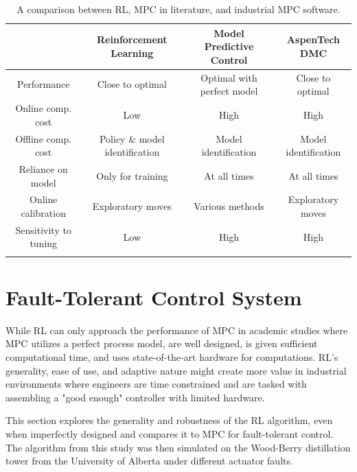 \begin{table}[H]
\caption{A comparison between RL, MPC in literature, and industrial MPC software.}
\centering
{\scriptsize
\begin{tabular}{c|c|c|c}
& \textbf{Reinforcement Learning}	& \textbf{Model Predictive Control} & \textbf{AspenTech DMC}\\
\hline
Performance             & Close to optimal			& Optimal with perfect model   &  Close to optimal \\
Online comp. cost		& Low			& High   &  High \\
Offline comp. cost		& Policy \& model identification			& Model identification   &  Model identification \\
Reliance on model         	& Only for training			& At all times   &  At all times \\
Online calibration		& Exploratory moves			&  Various methods   &  Exploratory moves \\
Sensitivity to tuning   & Low			& High   &  High \\
\label{tab:rl_mpc_dmc}
\end{tabular}}
\end{table}

%
%
% 
%  
% 
% 
% 

\section{Fault-Tolerant Control System}
While RL can only approach the performance of MPC in academic studies where MPC utilizes a perfect process model, are well designed, is given sufficient computational time, and uses state-of-the-art hardware for computations.  RL's generality, ease of use, and adaptive nature might create more value in industrial environments where engineers are time constrained and are tasked with assembling a "good enough" controller with limited hardware.

This section explores the generality and robustness of the RL algorithm, even when imperfectly designed and compares it to MPC for fault-tolerant control.  The algorithm from this study was then simulated on the Wood-Berry distillation tower from the University of Alberta under different actuator faults.

